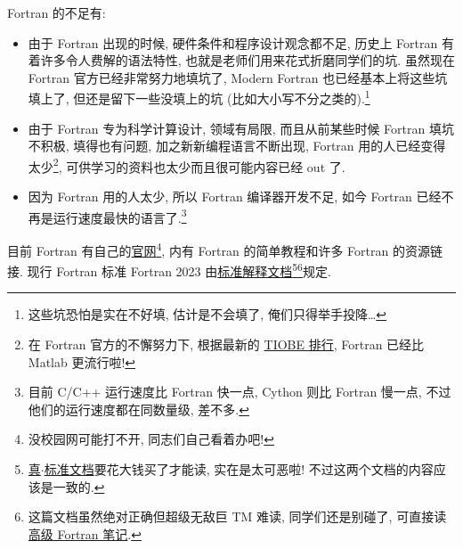 Fortran 的不足有:
\begin{itemize}
    \item 由于 Fortran 出现的时候, 硬件条件和程序设计观念都不足, 历史上 Fortran 有着许多令人费解的语法特性, 也就是老师们用来花式折磨同学们的坑. 虽然现在 Fortran 官方已经非常努力地填坑了, Modern Fortran 也已经基本上将这些坑填上了, 但还是留下一些没填上的坑 (比如大小写不分之类的).\footnote{这些坑恐怕是实在不好填, 估计是不会填了, 俺们只得举手投降\dots{}}
    \item 由于 Fortran 专为科学计算设计, 领域有局限, 而且从前某些时候 Fortran 填坑不积极, 填得也有问题, 加之新新编程语言不断出现, Fortran 用的人已经变得太少\footnote{在 Fortran 官方的不懈努力下, 根据最新的 \href{https://www.tiobe.com/tiobe-index/}{TIOBE 排行}, Fortran 已经比 Matlab 更流行啦!}, 可供学习的资料也太少而且很可能内容已经 out 了.
    \item 因为 Fortran 用的人太少, 所以 Fortran 编译器开发不足, 如今 Fortran 已经不再是运行速度最快的语言了.\footnote{目前 C/C++ 运行速度比 Fortran 快一点, Cython 则比 Fortran 慢一点, 不过他们的运行速度都在同数量级, 差不多.}
\end{itemize}

目前 Fortran 有自己的\href{https://fortran-lang.org/}{官网}\footnote{没校园网可能打不开, 同志们自己看着办吧!}, 内有 Fortran 的简单教程和许多 Fortran 的资源链接. 现行 Fortran 标准 Fortran 2023 由\href{https://j3-fortran.org/doc/year/24/24-007.pdf}{标准解释文档}\footnote{\href{https://www.iso.org/standard/82170.html}{真$\cdot$标准文档}要花大钱买了才能读, 实在是太可恶啦! 不过这两个文档的内容应该是一致的.}\footnote{这篇文档虽然绝对正确但超级无敌巨 TM 难读, 同学们还是别碰了, 可直接读\href{https://github.com/GasinAn/AdvForNotes}{高级 Fortran 笔记}.}规定.
